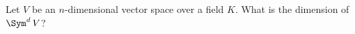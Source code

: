 \begin{problem}
Let $V$ be an $n$-dimensional vector space over a field $K$. What is the dimension of $\Sym^d\,V$?
\end{problem}